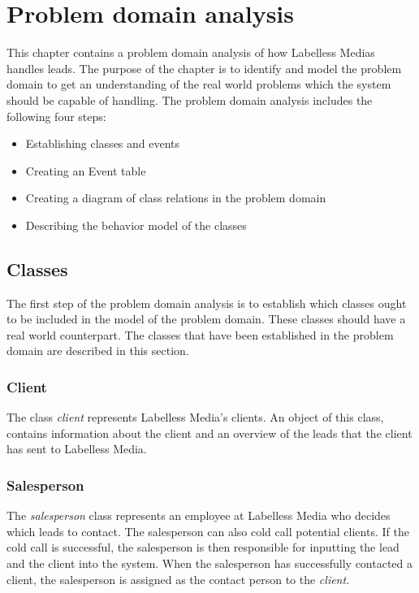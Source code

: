 \chapter{Problem domain analysis}\label{ch:problemanalysis}
This chapter contains a problem domain analysis of how Labelless Medias handles leads. The purpose of the chapter is to identify and model the problem domain to get an understanding of the real world problems which the system should be capable of handling. The problem domain analysis includes the following four steps:
\begin{itemize}
  \item Establishing classes and events
  \item Creating an Event table
  \item Creating a diagram of class relations in the problem domain
  \item Describing the behavior model of the classes
\end{itemize}
\noindent

\section{Classes}
The first step of the problem domain analysis is to establish which classes ought to be included in the model of the problem domain. These classes should have a real world counterpart. The classes that have been established in the problem domain are described in this section.

\subsection{Client}
The class \textit{client} represents Labelless Media's clients. 
An object of this class, contains information about the client and an overview of the leads that the client has sent to Labelless Media. 

\subsection{Salesperson}
The \textit{salesperson} class represents an employee at Labelless Media who decides which leads to contact.
The salesperson can also cold call potential clients. If the cold call is successful, the salesperson is then responsible for inputting the lead and the client into the system.
When the salesperson has successfully contacted a client, the salesperson is assigned as the contact person to the \textit{client}.

